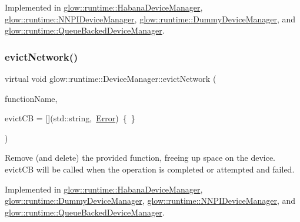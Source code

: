 Implemented in \hyperlink{classglow_1_1runtime_1_1_habana_device_manager_ac812a0a4b70e788e13255ad144bf792f}{glow\+::runtime\+::\+Habana\+Device\+Manager}, \hyperlink{classglow_1_1runtime_1_1_n_n_p_i_device_manager_a4fcbaacf52744393b047392777c9ae14}{glow\+::runtime\+::\+N\+N\+P\+I\+Device\+Manager}, \hyperlink{classglow_1_1runtime_1_1_dummy_device_manager_a73a826505a055281b9ad2902f6ffdb0f}{glow\+::runtime\+::\+Dummy\+Device\+Manager}, and \hyperlink{classglow_1_1runtime_1_1_queue_backed_device_manager_a70b2d1886841e1c223e6813e218545f5}{glow\+::runtime\+::\+Queue\+Backed\+Device\+Manager}.

\mbox{\label{classglow_1_1runtime_1_1_device_manager_a147c76a007db17659c1962c1fa864f9a}} 
\subsubsection{\texorpdfstring{evict\+Network()}{evictNetwork()}}
{\footnotesize\ttfamily virtual void glow\+::runtime\+::\+Device\+Manager\+::evict\+Network (\begin{DoxyParamCaption}\item[{std\+::string}]{function\+Name,  }\item[{Evict\+Function\+C\+B\+Ty}]{evict\+CB = {\ttfamily \mbox{[}\mbox{]}(std\+:\+:string,~\hyperlink{namespaceglow_afdb176c3a672ef66db0ecfc19a8d39bf}{Error})~\{~\}} }\end{DoxyParamCaption})\hspace{0.3cm}{\ttfamily [pure virtual]}}

Remove (and delete) the provided function, freeing up space on the device. {\ttfamily evict\+CB} will be called when the operation is completed or attempted and failed. 

Implemented in \hyperlink{classglow_1_1runtime_1_1_habana_device_manager_a142fa73f19c5731a522a40c2646c070e}{glow\+::runtime\+::\+Habana\+Device\+Manager}, \hyperlink{classglow_1_1runtime_1_1_dummy_device_manager_a69a52700a23ae64f2c9db09e1e32c038}{glow\+::runtime\+::\+Dummy\+Device\+Manager}, \hyperlink{classglow_1_1runtime_1_1_n_n_p_i_device_manager_ae8afcfbbd9badbdd13dacc08d813ec2d}{glow\+::runtime\+::\+N\+N\+P\+I\+Device\+Manager}, and \hyperlink{classglow_1_1runtime_1_1_queue_backed_device_manager_abbccad8e2a9b082eb6c5865352c67ef8}{glow\+::runtime\+::\+Queue\+Backed\+Device\+Manager}.

